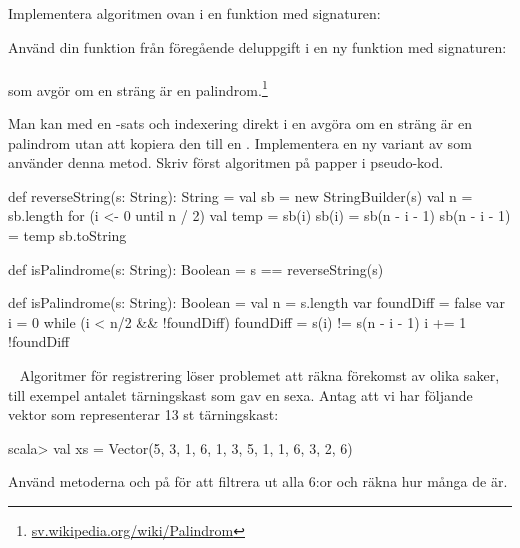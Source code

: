 \Subtask Implementera algoritmen ovan i en funktion med signaturen: \\

\Subtask Använd din funktion  från föregående deluppgift i en ny funktion med signaturen:\\
  \\ som avgör om en sträng är en palindrom.\footnote{\href{https://sv.wikipedia.org/wiki/Palindrom}{sv.wikipedia.org/wiki/Palindrom}}

\Subtask\Pen Man kan med en -sats och indexering direkt i en  avgöra om en sträng är en palindrom utan att kopiera den till en . Implementera en ny variant av  som använder denna metod. Skriv först algoritmen på papper i pseudo-kod.

\SOLUTION


\TaskSolved \what


\SubtaskSolved  \begin{Code}
def reverseString(s: String): String = {
  val sb = new StringBuilder(s)
  val n = sb.length
  for (i <- 0 until n / 2) {
    val temp = sb(i)
    sb(i) = sb(n - i - 1)
    sb(n - i - 1) = temp
  }
  sb.toString
}
\end{Code}

\SubtaskSolved  \begin{Code}
def isPalindrome(s: String): Boolean = {s == reverseString(s)}
\end{Code}

\SubtaskSolved  \begin{Code}
def isPalindrome(s: String): Boolean = {
  val n = s.length
  var foundDiff = false
  var i = 0
  while (i < n/2 && !foundDiff)  {
    foundDiff = s(i) != s(n - i - 1)
    i += 1
  }
  !foundDiff
}
\end{Code}



\QUESTEND









\QUESTBEGIN

\Task \label{task:seq-reg} \what~   Algoritmer för registrering löser problemet att räkna förekomst av olika saker, till exempel antalet tärningskast som gav en sexa. Antag att vi har följande vektor  som representerar 13 st tärningskast:
\begin{REPL}
scala> val xs = Vector(5, 3, 1, 6, 1, 3, 5, 1, 1, 6, 3, 2, 6)
\end{REPL}
\Subtask Använd metoderna  och  på  för att filtrera ut alla 6:or och räkna hur många de är.

